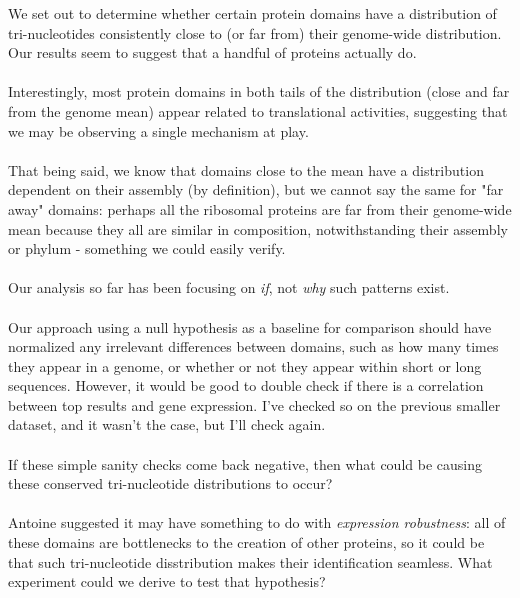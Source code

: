 \documentclass[12pt]{article}
\begin{document}
We set out to determine whether certain protein domains have a distribution of tri-nucleotides consistently close to (or far from) their genome-wide distribution. Our results seem to suggest that a handful of proteins actually do.\\
\\
Interestingly, most protein domains in both tails of the distribution (close and far from the genome mean) appear related to translational activities, suggesting that we may be observing a single mechanism at play.\\
\\
That being said, we know that domains close to the mean have a distribution dependent on their assembly (by definition), but we cannot say the same for "far away" domains: perhaps all the ribosomal proteins are far from their genome-wide mean because they all are similar in composition, notwithstanding their assembly or phylum - something we could easily verify.\\
\\
Our analysis so far has been focusing on \textit{if}, not \textit{why} such patterns exist.\\
\\
Our approach using a null hypothesis as a baseline for comparison should have normalized any irrelevant differences between domains, such as how many times they appear in a genome, or whether or not they appear within short or long sequences. However, it would be good to double check if there is a correlation between top results and gene expression. I've checked so on the previous smaller dataset, and it wasn't the case, but I'll check again.\\
\\
If these simple sanity checks come back negative, then what could be causing these conserved tri-nucleotide distributions to occur?\\
\\
Antoine suggested it may have something to do with \textit{expression robustness}: all of these domains are bottlenecks to the creation of other proteins, so it could be that such tri-nucleotide disstribution makes their identification seamless. What experiment could we derive to test that hypothesis?

\pagebreak



\end{document}

